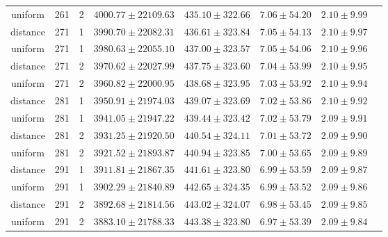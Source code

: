 \begin{tabular}{cccrrrrr}
uniform & 261 & 2 & $4000.77 \pm 22109.63$ & $435.10 \pm 322.66$ & $7.06 \pm 54.20$ & $2.10 \pm 9.99$\\
distance & 271 & 1 & $3990.70 \pm 22082.31$ & $436.61 \pm 323.84$ & $7.05 \pm 54.13$ & $2.10 \pm 9.97$\\
uniform & 271 & 1 & $3980.63 \pm 22055.10$ & $437.00 \pm 323.57$ & $7.05 \pm 54.06$ & $2.10 \pm 9.96$\\
distance & 271 & 2 & $3970.62 \pm 22027.99$ & $437.75 \pm 323.60$ & $7.04 \pm 53.99$ & $2.10 \pm 9.95$\\
uniform & 271 & 2 & $3960.82 \pm 22000.95$ & $438.68 \pm 323.95$ & $7.03 \pm 53.92$ & $2.10 \pm 9.94$\\
distance & 281 & 1 & $3950.91 \pm 21974.03$ & $439.07 \pm 323.69$ & $7.02 \pm 53.86$ & $2.10 \pm 9.92$\\
uniform & 281 & 1 & $3941.05 \pm 21947.22$ & $439.44 \pm 323.42$ & $7.02 \pm 53.79$ & $2.09 \pm 9.91$\\
distance & 281 & 2 & $3931.25 \pm 21920.50$ & $440.54 \pm 324.11$ & $7.01 \pm 53.72$ & $2.09 \pm 9.90$\\
uniform & 281 & 2 & $3921.52 \pm 21893.87$ & $440.94 \pm 323.85$ & $7.00 \pm 53.65$ & $2.09 \pm 9.89$\\
distance & 291 & 1 & $3911.81 \pm 21867.35$ & $441.61 \pm 323.80$ & $6.99 \pm 53.59$ & $2.09 \pm 9.87$\\
uniform & 291 & 1 & $3902.29 \pm 21840.89$ & $442.65 \pm 324.35$ & $6.99 \pm 53.52$ & $2.09 \pm 9.86$\\
distance & 291 & 2 & $3892.68 \pm 21814.56$ & $443.02 \pm 324.07$ & $6.98 \pm 53.45$ & $2.09 \pm 9.85$\\
uniform & 291 & 2 & $3883.10 \pm 21788.33$ & $443.38 \pm 323.80$ & $6.97 \pm 53.39$ & $2.09 \pm 9.84$\\
\bottomrule
\end{tabular}

